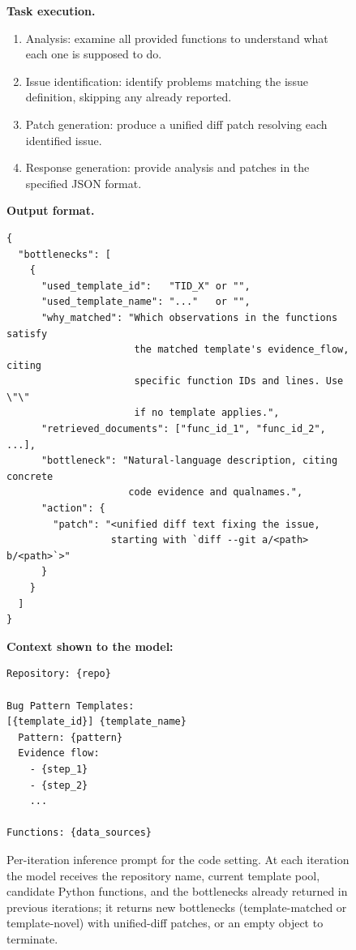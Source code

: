\documentclass{llmxive}
\begin{document}
\begin{figure}[!t]
\begin{tcolorbox}[colback=gray!5, colframe=gray!50,
                  boxrule=0.5pt, arc=2mm,
                  left=4pt, right=4pt, top=3pt, bottom=3pt]
\medskip
\textbf{Task execution.}
\begin{enumerate}[topsep=0pt, itemsep=0ex, parsep=0pt, left=14pt]
   \item Analysis: examine all provided functions to understand what each one is supposed to do.
   \item Issue identification: identify problems matching the issue definition, skipping any already reported.
   \item Patch generation: produce a unified diff patch resolving each identified issue.
   \item Response generation: provide analysis and patches in the specified JSON format.
\end{enumerate}

\medskip
\textbf{Output format.}
\begin{verbatim}
{
  "bottlenecks": [
    {
      "used_template_id":   "TID_X" or "",
      "used_template_name": "..."   or "",
      "why_matched": "Which observations in the functions satisfy
                      the matched template's evidence_flow, citing
                      specific function IDs and lines. Use \"\"
                      if no template applies.",
      "retrieved_documents": ["func_id_1", "func_id_2", ...],
      "bottleneck": "Natural-language description, citing concrete
                     code evidence and qualnames.",
      "action": {
        "patch": "<unified diff text fixing the issue,
                  starting with `diff --git a/<path> b/<path>`>"
      }
    }
  ]
}
\end{verbatim}

\medskip
\textbf{Context shown to the model:}
\begin{verbatim}
Repository: {repo}

Bug Pattern Templates:
[{template_id}] {template_name}
  Pattern: {pattern}
  Evidence flow:
    - {step_1}
    - {step_2}
    ...

Functions: {data_sources}
\end{verbatim}
\end{tcolorbox}
\caption{Per-iteration inference prompt for the code setting. At each iteration the model receives the repository name, current template pool, candidate Python functions, and the bottlenecks already returned in previous iterations; it returns new bottlenecks (template-matched or template-novel) with unified-diff patches, or an empty object to terminate.}
\label{fig:prompt_inference_code}
\end{figure}
\end{document}
